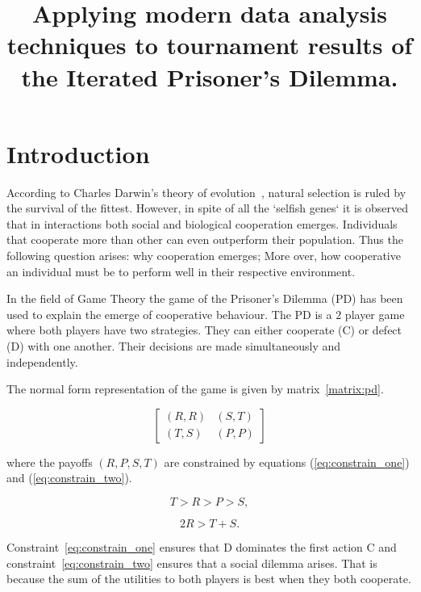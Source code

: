\documentclass{article}
\title{Applying modern data analysis techniques to tournament results of the
Iterated Prisoner's Dilemma.}
\date{}
\begin{document}
\maketitle

\section{Introduction}

According to Charles Darwin’s theory of evolution~\cite{oldroyd1986}, natural
selection is ruled by the survival of the fittest. However, in spite of all the
`selfish genes` it is observed that in interactions both social and biological
cooperation emerges. Individuals that cooperate more than other can even outperform
their population. Thus the following question arises: why cooperation emerges;
More over, how cooperative an individual must be to perform well in their respective
environment.

In the field of Game Theory the game of the Prisoner's Dilemma (PD) has been used
to explain the emerge of cooperative behaviour. The PD is a \(2\) player game
where both players have two strategies. They can either cooperate (C) or defect (D)
with one another. Their decisions are made simultaneously and independently.

The normal form representation of the game is given by matrix~\ref{matrix:pd}.

\begin{equation}\label{matrix:pd}
    \begin{bmatrix}
    (R,R) & (S,T)  \\
    (T,S) & (P,P)
    \end{bmatrix}
\end{equation}

where the payoffs \((R, P, S, T)\) are constrained by equations (\ref{eq:constrain_one})
and (\ref{eq:constrain_two}).

\begin{equation}\label{eq:constrain_one}
    T > R > P > S,
\end{equation}

\begin{equation}\label{eq:constrain_two}
    2R > T + S.
\end{equation}

Constraint~\ref{eq:constrain_one} ensures that D dominates the first action C
and constraint~\ref{eq:constrain_two} ensures that a social dilemma arises. That
is because the sum of the utilities to both players is best when they both cooperate.
\end{document}
